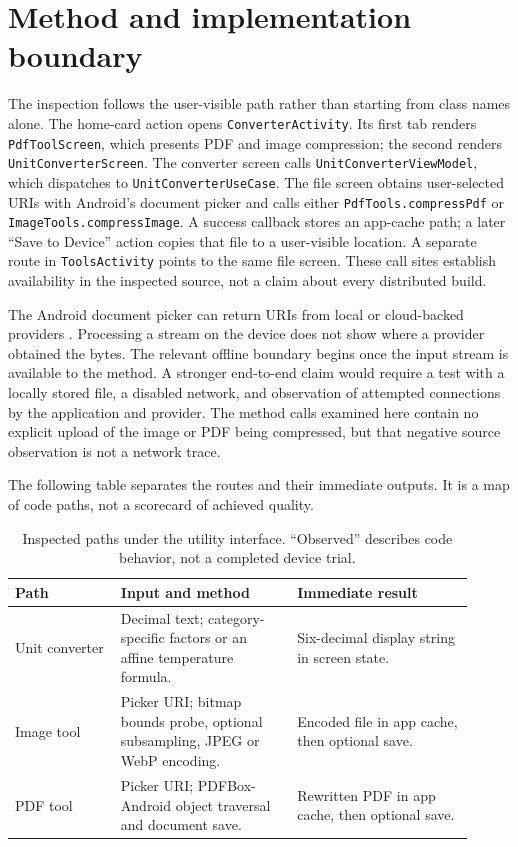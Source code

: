 \documentclass[10pt,letterpaper]{article}
\begin{document}
\section{Method and implementation boundary}

The inspection follows the user-visible path rather than starting from class names alone. The home-card action opens \texttt{ConverterActivity}. Its first tab renders \texttt{PdfToolScreen}, which presents PDF and image compression; the second renders \texttt{UnitConverterScreen}. The converter screen calls \texttt{UnitConverterViewModel}, which dispatches to \texttt{UnitConverterUseCase}. The file screen obtains user-selected URIs with Android's document picker and calls either \texttt{PdfTools.compressPdf} or \texttt{ImageTools.compressImage}. A success callback stores an app-cache path; a later ``Save to Device'' action copies that file to a user-visible location. A separate route in \texttt{ToolsActivity} points to the same file screen. These call sites establish availability in the inspected source, not a claim about every distributed build.

The Android document picker can return URIs from local or cloud-backed providers \cite{androidpicker}. Processing a stream on the device does not show where a provider obtained the bytes. The relevant offline boundary begins once the input stream is available to the method. A stronger end-to-end claim would require a test with a locally stored file, a disabled network, and observation of attempted connections by the application and provider. The method calls examined here contain no explicit upload of the image or PDF being compressed, but that negative source observation is not a network trace.

The following table separates the routes and their immediate outputs. It is a map of code paths, not a scorecard of achieved quality.

\begin{table}[H]
\centering\small
\caption{Inspected paths under the utility interface. ``Observed'' describes code behavior, not a completed device trial.}
\label{tab:inventory}
\begin{tabular}{@{}>{\raggedright\arraybackslash}p{0.21\linewidth}>{\raggedright\arraybackslash}p{0.35\linewidth}>{\raggedright\arraybackslash}p{0.35\linewidth}@{}}
\toprule
Path & Input and method & Immediate result \\
\midrule
Unit converter & Decimal text; category-specific factors or an affine temperature formula. & Six-decimal display string in screen state. \\
Image tool & Picker URI; bitmap bounds probe, optional subsampling, JPEG or WebP encoding. & Encoded file in app cache, then optional save. \\
PDF tool & Picker URI; PDFBox-Android object traversal and document save. & Rewritten PDF in app cache, then optional save. \\
\bottomrule
\end{tabular}
\end{table}
\end{document}
